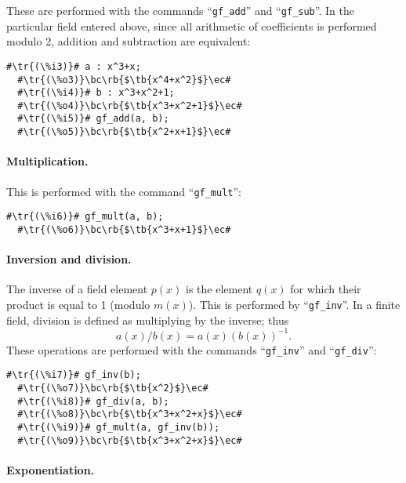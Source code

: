 \documentclass[a4paper,11pt,leqno,fleqn]{artikel3}
\newcommand{\bc}{\begin{center}}
\newcommand{\ec}{\end{center}}
\newcommand{\tr}[1]{\textcolor{red}{#1}}
\newcommand{\tb}[1]{\textcolor{blue}{#1}}
\newcommand{\rb}[1]{\raisebox{2mm}[0mm][1mm]{#1}}
\begin{document}
These are performed with the commands ``\verb!gf_add!'' and ``\verb!gf_sub!''.
In the particular field entered above, since all arithmetic of coefficients is
performed modulo 2, addition and subtraction are equivalent:

\vspace*{2mm}
\begin{lstlisting}[escapechar=\#]
  #\tr{(\%i3)}# a : x^3+x;
  #\tr{(\%o3)}\bc\rb{$\tb{x^4+x^2}$}\ec#
  #\tr{(\%i4)}# b : x^3+x^2+1;
  #\tr{(\%o4)}\bc\rb{$\tb{x^3+x^2+1}$}\ec#
  #\tr{(\%i5)}# gf_add(a, b);
  #\tr{(\%o5)}\bc\rb{$\tb{x^2+x+1}$}\ec#
\end{lstlisting}


\paragraph{Multiplication.}

This is performed with the command ``\verb!gf_mult!'':

\vspace*{2mm}
\begin{lstlisting}[escapechar=\#]
  #\tr{(\%i6)}# gf_mult(a, b);
  #\tr{(\%o6)}\bc\rb{$\tb{x^3+x+1}$}\ec#
\end{lstlisting}


\paragraph{Inversion and division.}

The inverse of a field element $p(x)$ is the element $q(x)$ for which their
product is equal to 1 (modulo $m(x)$).  This is performed by
``\verb!gf_inv!''.  In a finite field, division is defined as multiplying by
the inverse; thus
\[
a(x)/b(x)=a(x)(b(x))^{-1}.
\]
These operations are performed with the commands ``\verb!gf_inv!'' and
``\verb!gf_div!'':

\vspace*{2mm}
\begin{lstlisting}[escapechar=\#]
  #\tr{(\%i7)}# gf_inv(b);
  #\tr{(\%o7)}\bc\rb{$\tb{x^2}$}\ec#
  #\tr{(\%i8)}# gf_div(a, b);
  #\tr{(\%o8)}\bc\rb{$\tb{x^3+x^2+x}$}\ec#
  #\tr{(\%i9)}# gf_mult(a, gf_inv(b));
  #\tr{(\%o9)}\bc\rb{$\tb{x^3+x^2+x}$}\ec#
\end{lstlisting}


\paragraph{Exponentiation.}
\end{document}
